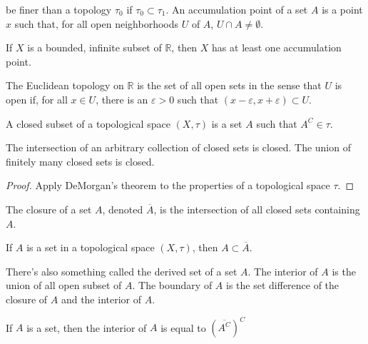 \documentclass[crop=false,class=book,oneside]{standalone}
\begin{document}
        be finer than a topology $\tau_{0}$ if
        $\tau_{0}\subset\tau_{1}$. An accumulation point
        of a set $A$ is a point $x$ such that, for
        all open neighborhoods $U$ of $A$,
        $U\cap{A}\ne\emptyset$.
        \begin{theorem}
            If $X$ is a bounded, infinite subset of
            $\mathbb{R}$, then $X$ has at least
            one accumulation point.
        \end{theorem}
        \begin{definition}
            The Euclidean topology on
            $\mathbb{R}$ is the set of
            all open sets in the sense that
            $U$ is open if, for all $x\in{U}$,
            there is an $\varepsilon>0$ such
            that $(x-\varepsilon,x+\varepsilon)\subset{U}$.
        \end{definition}
        \begin{definition}
            A closed subset of a topological space
            $(X,\tau)$ is a set $A$ such that
            $A^{C}\in\tau$.
        \end{definition}
        \begin{theorem}
            The intersection of an arbitrary collection of
            closed sets is closed. The union of finitely
            many closed sets is closed.
        \end{theorem}
        \begin{proof}
            Apply DeMorgan's theorem to the properties
            of a topological space $\tau$.
        \end{proof}
        \begin{definition}
            The closure of a set $A$,
            denoted $\overline{A}$, is the
            intersection of all closed sets
            containing $A$.
        \end{definition}
        \begin{theorem}
            If $A$ is a set in a topological space
            $(X,\tau)$, then $A\subset\overline{A}$.
        \end{theorem}
        There's also something called the derived
        set of a set $A$. The interior of $A$
        is the union of all open subset of $A$.
        The boundary of $A$ is the set difference
        of the closure of $A$ and the interior of
        $A$.
        \begin{theorem}
            If $A$ is a set, then
            the interior of $A$ is equal to
            $(\overline{A^{C}})^{C}$
        \end{theorem}
\end{document}
